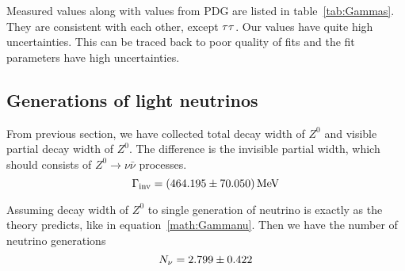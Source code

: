 Measured values along with values from PDG are listed in table~\ref{tab:Gammas}. They are consistent with each other, except $\tau\tau$. Our values have quite high uncertainties. This can be traced back to poor quality of fits and the fit parameters have high uncertainties.

\subsection{Generations of light neutrinos}
From previous section, we have collected total decay width of $Z^0$ and visible partial decay width of $Z^0$. The difference is the invisible partial width, which should consists of $Z^0 \rightarrow \nu\bar\nu$ processes.
\begin{equation}
	\Gamma_\text{inv} = \SI{464.195 +- 70.050}{\mega\eV}
\end{equation}

Assuming decay width of $Z^0$ to single generation of neutrino is exactly as the theory predicts, like in equation~\ref{math:Gammanu}. Then we have the number of neutrino generations 
\begin{equation}
	N_{\nu} = \num{2.799 +- 0.422}
\end{equation}

